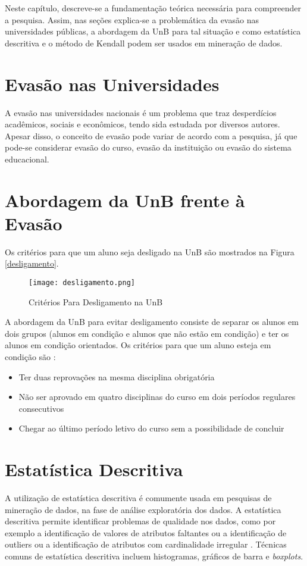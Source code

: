 Neste capítulo, descreve-se a fundamentação teórica necessária para compreender a
pesquisa. Assim, nas seções explica-se a problemática da evasão nas universidades
públicas, a abordagem da UnB para tal situação e como estatística descritiva e o
método de Kendall podem ser usados em mineração de dados. 

\section{Evasão nas Universidades} 
A evasão nas universidades nacionais é um problema que traz desperdícios acadêmicos,
sociais e econômicos, tendo sida estudada por diversos autores. Apesar disso, o
conceito de evasão pode variar \cite{mec_conceito_evasao} de acordo com a pesquisa,
já que pode-se considerar evasão do curso, evasão da instituição ou evasão do
sistema educacional. 

\section{Abordagem da UnB frente à Evasão}
\par Os critérios para que um aluno seja desligado na UnB são mostrados na Figura
\ref{desligamento}. 
\begin{figure}[!ht]
    \caption{Critérios Para Desligamento na UnB}
    \centering
    \texttt{[image: desligamento.png]}
\end{figure}
 
A abordagem da UnB para evitar desligamento consiste de separar os alunos em dois
grupos (alunos em condição e alunos que não estão em condição) e ter os alunos em
condição orientados. Os critérios para que um aluno esteja em condição são
\cite{manual_calouro}: 
\begin{itemize}
    \item Ter duas reprovações na mesma disciplina obrigatória
    \item Não ser aprovado em quatro disciplinas do curso em dois períodos regulares
        consecutivos
    \item Chegar ao último período letivo do curso sem a possibilidade de concluir
\end{itemize}

\section{Estatística Descritiva} 
A utilização de estatística descritiva é comumente usada em pesquisas de mineração de
dados, na fase de análise exploratória dos dados. A estatística descritiva permite
identificar problemas de qualidade nos dados, como por exemplo a identificação de
valores de atributos faltantes ou a identificação de outliers ou a identificação de
atributos com cardinalidade irregular \cite{ml_book}. Técnicas comuns de estatística
descritiva incluem histogramas, gráficos de barra e \textit{boxplots}. 

